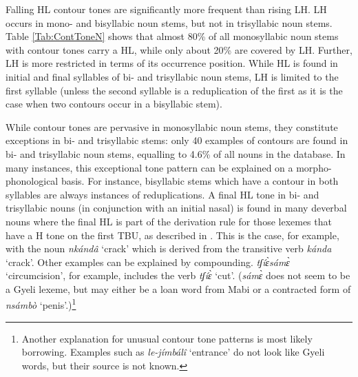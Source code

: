 Falling HL contour tones are significantly more frequent than rising LH. LH occurs in mono- and bisyllabic noun stems, but not in trisyllabic noun stems. Table \ref{Tab:ContToneN} shows that almost 80\% of all monosyllabic noun stems with contour tones carry a HL, while only about 20\% are covered by LH. Further, LH is more restricted in terms of its occurrence position. While HL is found in initial and final syllables of bi- and trisyllabic noun stems, LH is limited to the first syllable (unless the second syllable is a reduplication of the first as it is the case when two contours occur in a bisyllabic stem).

While contour tones are pervasive in monosyllabic noun stems, they constitute exceptions in bi- and trisyllabic stems: only 40 examples of contours are found in bi- and trisyllabic noun stems, equalling to  4.6\% of all nouns in the database. In many instances, this exceptional tone pattern can be explained on a morpho-phonological basis. For instance, bisyllabic stems which have a contour in both syllables are always instances of reduplications. A final HL tone in bi- and trisyllabic nouns (in conjunction with an initial nasal) is found in many deverbal nouns where the final HL is part of the derivation rule for those lexemes that have a H tone on the first TBU, as described in . This is the case, for example, with the noun {\itshape nkándâ} `crack' which is derived from the transitive verb {\itshape kánda} `crack'. Other examples can be explained by compounding. {\itshape tʃíɛ̀sámɛ̀} `circumcision', for example, includes the verb {\itshape tʃíɛ̀} `cut'. ({\itshape sámɛ̀} does not seem to be a Gyeli lexeme, but may either be a loan word from Mabi or a contracted form of {\itshape nsámbò} `penis'.)\footnote{Another explanation for unusual contour tone patterns is most likely borrowing. Examples such as {\itshape le-jímbálî} `entrance' do not look like Gyeli words, but their source is not known.} 





